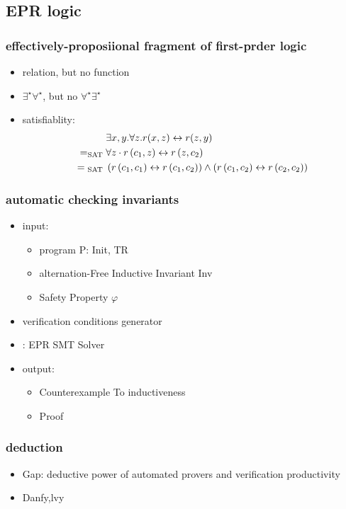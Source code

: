 \subsection{EPR logic}
\begin{frame}
    \frametitle{effectively-proposiional fragment of first-prder logic}
    \begin{itemize}
        \item relation, but no function
        \item $\exists^{\star} \forall ^{\star}$, but no $\forall^{\star} \exists ^{\star}$
        \item satisfiablity:
        \begin{align}
            &\exists x, y . \forall z . r(x, z) \leftrightarrow r(z, y) \notag\\
            = _{\text {SAT }}& \forall z \cdot r\left(c_{1}, z\right) \leftrightarrow r\left(z, c_{2}\right) \notag\\
            = { }_{\text {SAT }}&\left(r\left(c_{1}, c_{1}\right) \leftrightarrow r\left(c_{1}, c_{2}\right)\right) \wedge\left(r\left(c_{1}, c_{2}\right) \leftrightarrow r\left(c_{2}, c_{2}\right)\right)
        \end{align}
    \end{itemize}
\end{frame}
\begin{frame}
    \frametitle{automatic checking invariants}
    \begin{itemize}
        \item input:
        \begin{itemize}
            \item program P: Init, TR
            \item alternation-Free Inductive Invariant Inv
            \item Safety Property $\varphi$
        \end{itemize}
        \item verification conditions generator
        \item: EPR SMT Solver
        \item output:
        \begin{itemize}
            \item Counterexample To inductiveness
            \item Proof
        \end{itemize}
    \end{itemize}
\end{frame}
\begin{frame}
    \frametitle{deduction}
    \begin{itemize}
        \item Gap: deductive power of automated provers and verification productivity
        \item Danfy,lvy
    \end{itemize}
\end{frame}
